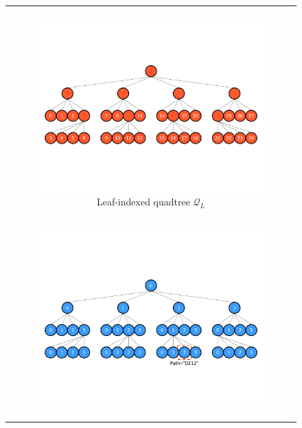 \begin{figure}
    \centering
    \begin{tabular}{c}
    \smallskip
        \begin{subfigure}[t]{0.8\textwidth}
            \centering
            \includegraphics[width=\textwidth, clip=true, trim={0 150 0 150}]{figures/leaf-indexed-quadtree-serial.pdf}
            \caption{Leaf-indexed quadtree $\mathcal{Q}_L$}
            \label{subfig:leaf-indexed-quadtree-serial}
        \end{subfigure}
        \\
        \begin{subfigure}[t]{0.8\textwidth}
            \centering
            \includegraphics[width=\textwidth, clip=true, trim={0 140 0 150}]{figures/path-indexed-quadtree-serial.pdf}

\end{subfigure}
\end{tabular}
\end{figure}
